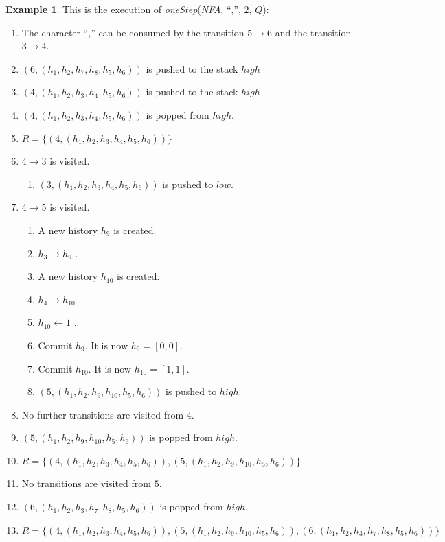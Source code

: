 \documentclass[english]{sigplanconf}
\theoremstyle{definition}
\newtheorem{example}{Example}[section]
\newcommand{\del}[1]{\textcolor{red}{\sout{#1}}} %
\newcommand{\del}[1]{} %
\renewcommand{\del}[1]{} %
\begin{document}
\begin{example}
This is the execution of \emph{oneStep}(\emph{NFA}, ``,'', $2$, $Q$):
\begin{enumerate}
\item The character ``,'' can be consumed by the transition $5\rightarrow 6$ and the transition $3\rightarrow 4$.
\item $(6, (h_1, h_2, h_7, h_8, h_5, h_6))$ is pushed to the stack $high$
\item $(4, (h_1, h_2, h_3, h_4, h_5, h_6))$ is pushed to the stack $high$
\item $(4, (h_1, h_2, h_3, h_4, h_5, h_6))$ is popped from $high$.
\item $R=\{(4, (h_1, h_2, h_3, h_4, h_5, h_6))\}$
\item $4\rightarrow 3$ is visited. \begin{enumerate}
	\item $(3, (h_1, h_2, h_3, h_4, h_5, h_6))$ is pushed to $low$.
\end{enumerate}
\item $4\rightarrow 5$ is visited. \begin{enumerate}
	\item A new history $h_9$ is created.
	\item $h_3\rightarrow h_9$ \del{is executed}.
	\item A new history $h_{10}$ is created.
	\item $h_4\rightarrow h_{10}$ \del{is executed}.
	\item $h_{10} \leftarrow 1$ \del{is executed}.
	\item Commit $h_9$. It is now $h_9=[0,0]$.
	\item Commit $h_{10}$. It is now $h_{10}=[1,1]$.
	\item $(5, (h_1, h_2, h_9, h_{10}, h_5, h_6))$ is pushed to $high$.
\end{enumerate}
\item No further transitions are visited from $4$.
\item $(5, (h_1, h_2, h_9, h_{10}, h_5, h_6))$ is popped from $high$.
\item $R=\{(4, (h_1, h_2, h_3, h_4, h_5, h_6)),\allowbreak (5, (h_1, h_2, h_9, h_{10}, h_5, h_6))\}$
\item No transitions are visited from $5$.
\item $(6, (h_1, h_2, h_3, h_7, h_8, h_5, h_6))$ is popped from $high$.
\item $R=\{(4, (h_1, h_2, h_3, h_4, h_5, h_6)),\allowbreak (5, (h_1, h_2, h_9, h_{10}, h_5, h_6)),\allowbreak (6, (h_1, h_2, h_3, h_7, h_8, h_5, h_6))\}$

\end{enumerate}
\end{example}
\end{document}
